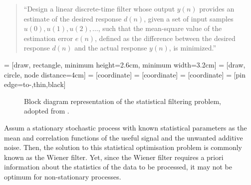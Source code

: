 \begin{quote}``Design a linear discrete-time filter whose output $y(n)$ provides an estimate of the desired response $d(n)$, given a set of input samples $u(0), u(1), u(2), \dots$, such that the mean-square value of the estimation error $e(n)$, defined as the difference between the desired response $d(n)$ and the actual response $y(n)$, is minimized.''
\end{quote}

 = [draw, rectangle, 
    minimum height=2.6cm, minimum width=3.2cm]
 = [draw, circle, node distance=4cm]
 = [coordinate]
 = [coordinate]
 = [coordinate]
 = [pin edge={to-,thin,black}]

\begin{figure}
\centering
{}
\caption{Block diagram representation of the statistical filtering problem, adopted from \cite{haykin2002adaptive}.} \label{fig:filtering_problem}
\end{figure}

Assum a stationary stochastic process with known statistical parameters as the mean and correlation functions of the useful signal and the unwanted additive noise. Then, the solution to this statistical optimisation problem is commonly known as the Wiener filter. Yet, since the Wiener filter requires a priori information about the statistics of the data to be processed, it may not be optimum for non-stationary processes.

